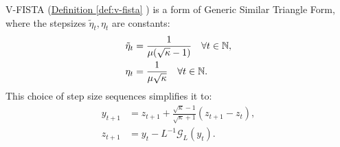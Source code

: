 \documentclass[12pt]{article}
\begin{document}
        \begin{proposition}
        \label{prop:vfista-parameter-math}
            V-FISTA 
            (\hyperref[def:v-fista]{Definition \ref*{def:v-fista}}
            ) is a form of Generic Similar Triangle Form, where the stepsizes $\tilde \eta_t, \eta_t$ are constants: 
            \begin{align*}
                \tilde \eta_t 
                &= \frac{1}{\mu(\sqrt{\kappa} - 1)}
                \quad \forall t \in \mathbb N, 
                \\
                \eta_t
                &= 
                \frac{1}{\mu\sqrt{\kappa}}
                \quad \forall t \in \mathbb N. 
            \end{align*}
            This choice of step size sequences simplifies it to:
            \begin{align*}
                y_{t + 1} &= z_{t + 1} + 
                \frac{\sqrt{\kappa} - 1}{\sqrt{\kappa} + 1}
                (z_{t +1} - z_t), 
                \\
                z_{t + 1} 
                &= y_t - L^{-1}\mathcal G_L(y_t). 
            \end{align*}
        \end{proposition}
\end{document}
